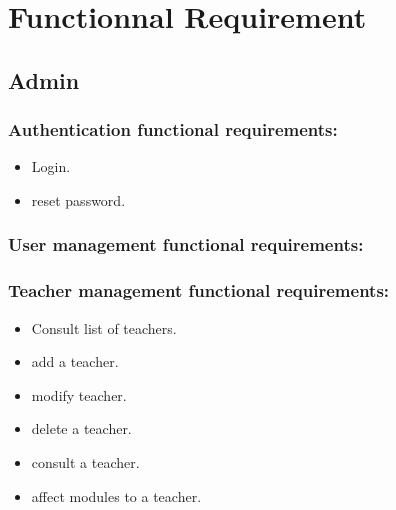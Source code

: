 \documentclass[a4paper,12p]{article}
\begin{document}




    \tableofcontents
    \newpage

     \raggedright\section{Functionnal Requirement}

    \subsection{Admin}
    \begin{itemize}
        \subsubsection{Authentication functional requirements:}
        \begin{itemize}
            \item Login.
            \item reset password.
        \end{itemize}

        \subsubsection{User management functional requirements:}
        \begin{itemize}

            \subsubsection{Teacher management functional requirements:}
            \begin{itemize}
                \item Consult list of teachers.
                \item add a teacher.
                \item modify teacher.
                \item delete a teacher.
                \item consult a teacher.
                \item affect modules to a teacher.
            \end{itemize}


\end{itemize}
\end{itemize}
\end{document}
